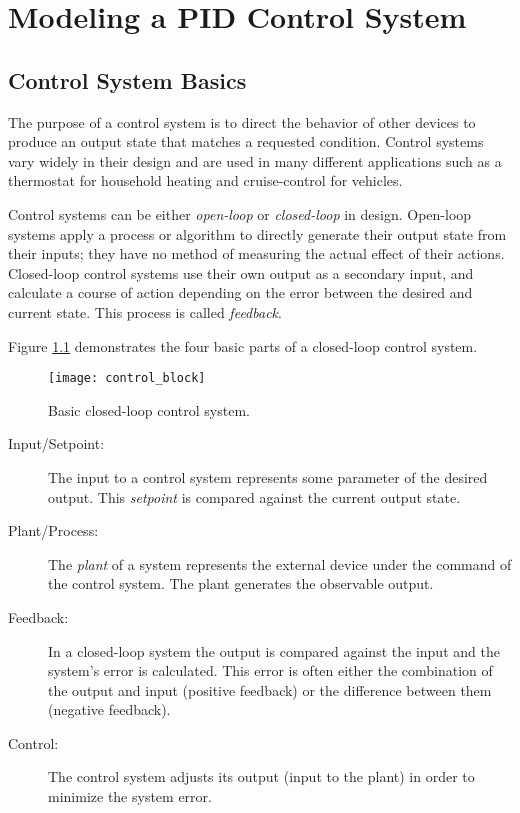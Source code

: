 \documentclass[11pt,fleqn]{book} %
\begin{document}
	
\chapter{Modeling a PID Control System}

\section{Control System Basics}
The purpose of a control system is to direct the behavior of other devices to produce an output state that matches a requested condition. Control systems vary widely in their design and are used in many different applications such as a thermostat for household heating and cruise-control for vehicles.

Control systems can be either \textit{open-loop} or \textit{closed-loop} in design. Open-loop systems apply a process or algorithm to directly generate their output state from their inputs; they have no method of measuring the actual effect of their actions. Closed-loop control systems use their own output as a secondary input, and calculate a course of action depending on the error between the desired and current state. This process is called \textit{feedback}.

Figure \ref{control_block} demonstrates the four basic parts of a closed-loop control system. 

\begin{figure}[tb]
    \centering\texttt{[image: control\_block]}
    \caption{Basic closed-loop control system.}
    \label{control_block}
\end{figure}

\begin{description}
    \item [Input/Setpoint:] The input to a control system represents some parameter of the desired output. This \textit{setpoint} is compared against the current output state. 
    \item [Plant/Process:] The \textit{plant} of a system represents the external device under the command of the control system. The plant generates the observable output.
    \item [Feedback:] In a closed-loop system the output is compared against the input and the system's error is calculated. This error is often either the combination of the output and input (positive feedback) or the difference between them (negative feedback).
    \item [Control:] The control system adjusts its output (input to the plant) in order to minimize the system error. 
\end{description}
\end{document}
